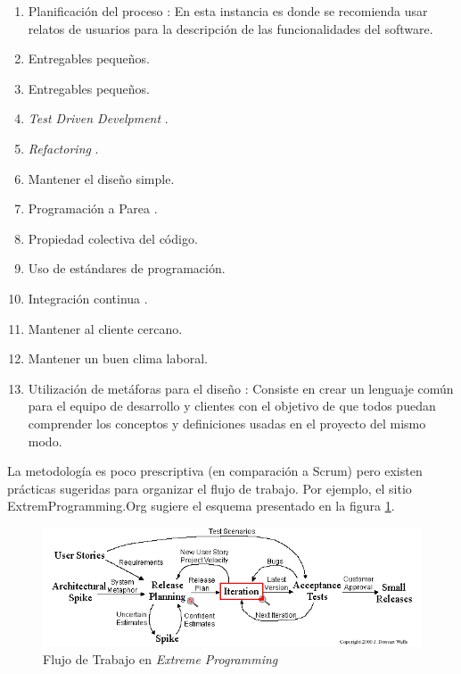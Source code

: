 \begin{enumerate}
  \item Planificación del proceso : En esta instancia es donde se recomienda usar relatos de usuarios para la descripción de las funcionalidades del software.
  \item Entregables pequeños.
  \item Entregables pequeños.
  \item \textit{Test Driven Develpment} .
  \item \textit{Refactoring} .
  \item Mantener el diseño simple.
  \item Programación a Parea .
  \item Propiedad colectiva del código.
  \item Uso de estándares de programación.
  \item Integración continua .
  \item Mantener al cliente cercano.
  \item Mantener un buen clima laboral.
  \item Utilización de metáforas para el diseño : Consiste en crear un lenguaje común para el equipo de desarrollo y clientes con el objetivo de que todos puedan comprender los conceptos y definiciones usadas en el proyecto del mismo modo.
\end{enumerate}

La metodología es poco prescriptiva (en comparación a Scrum) pero existen prácticas sugeridas para organizar el flujo de trabajo. Por ejemplo, el sitio ExtremProgramming.Org sugiere el esquema presentado en la figura \ref{fig:extreme_programming_workflow}.

\begin{figure}[ht]
	\begin{center}
  \includegraphics[width=1\textwidth]{./figures/chapter_02/08_extreme_programming_project.png}
  \caption{Flujo de Trabajo en \textit{Extreme Programming}}
  \label{fig:extreme_programming_workflow}
	\end{center}
\end{figure}

